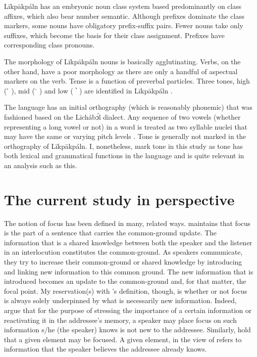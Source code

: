 \documentclass[output=paper,colorlinks,citecolor=brown]{langscibook}
\begin{document}
Līkpākpáln has an embryonic noun class system based predominantly on class affixes, which also bear number semantic. Although prefixes dominate the class markers, some nouns have obligatory prefix-suffix pairs. Fewer nouns take only suffixes, which become the basis for their class assignment. Prefixes have corresponding class pronouns.

The morphology of Līkpākpáln nouns is basically agglutinating. Verbs, on the other hand, have a poor morphology as there are only a handful of aspectual markers on the verb. Tense is a function of preverbal particles. Three tones, high ( ́  ), mid ( ̄  ) and low ( ՝ ) are identified in Līkpākpáln \citep[16]{SteeleWeed1966}.

The language has an initial orthography (which is reasonably phonemic) that was fashioned based on the Līchábͻ́l dialect. Any sequence of two vowels (whether representing a long vowel or not) in a word is treated as two syllable nuclei that may have the same or varying pitch levels \citep{BisilkiAkpanglo-Nartey2017}. Tone is generally not marked in the orthography of Līkpākpáln. I, nonetheless, mark tone in this study as tone has both lexical and grammatical functions in the language and is quite relevant in an analysis such as this.

\section{The current study in perspective}\label{sec:bisilki:3}

The notion of focus has been defined in many, related ways. \citet[92]{VanPutten2016} maintains that focus is the part of a sentence that carries the common-ground update. The information that is a shared knowledge between both the speaker and the listener in an interlocution constitutes the common-ground. As speakers communicate, they try to increase their common-ground or shared knowledge by introducing and linking new information to this common ground. The new information that is introduced becomes an update to the common-ground and, for that matter, the focal point. My reservation(s) with \citeauthor{VanPutten2016}’s definition, though, is whether or not focus is always solely underpinned by what is necessarily new information. Indeed, \citet[59]{Dik1981} argue that for the purpose of stressing the importance of a certain information or reactivating it in the addressee’s memory, a speaker may place focus on such information s/he (the speaker) knows is not new to the addressee. Similarly, \citet[3]{SkopeteasEtAl2006} hold that a given element may be focused. A given element, in the view of \citet[2]{SkopeteasEtAl2006} refers to information that the speaker believes the addressee already knows.
\end{document}
